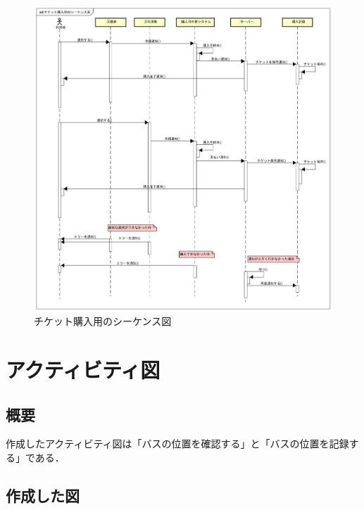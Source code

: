 \documentclass[documentclass]{jsarticle}
\begin{document}
\begin{figure}[H]
  \begin{center}
    \includegraphics*[scale=0.4]{figure/6-2.png}
  \end{center}
  \caption{チケット購入用のシーケンス図}
  \label{fig:6-2}
\end{figure}

\newpage

\section{アクティビティ図}
\subsection*{概要}
作成したアクティビティ図は「バスの位置を確認する」と「バスの位置を記録する」である．


\subsection*{作成した図}
\end{document}
